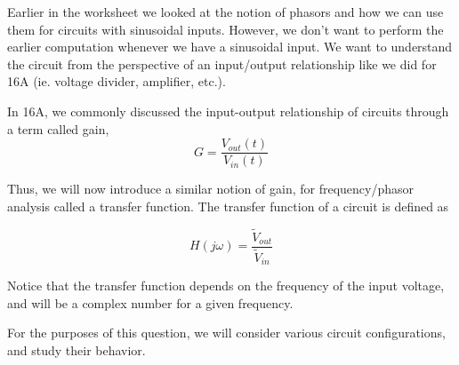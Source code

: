 

Earlier in the worksheet we looked at the notion of phasors and how we can use them for circuits with sinusoidal inputs.
However, we don't want to perform the earlier computation whenever we have a sinusoidal input.
We want to understand the circuit from the perspective of an input/output relationship like we did for 16A (ie. voltage divider, amplifier, etc.).

In 16A, we commonly discussed the input-output relationship of circuits through a term called gain,
\begin{equation}
G = \frac{V_{out}(t)}{V_{in}(t)}
\end{equation}

Thus, we will now introduce a similar notion of gain, for frequency/phasor analysis called a transfer function.
The transfer function of a circuit is defined as

\begin{equation}
H(j \omega) = \frac{\widetilde{V}_{out}}{\widetilde{V}_{in}}
\end{equation}

Notice that the transfer function depends on the frequency of the input voltage, and will be a complex number for a given frequency.

For the purposes of this question, we will consider various circuit configurations, and study their behavior.

%


